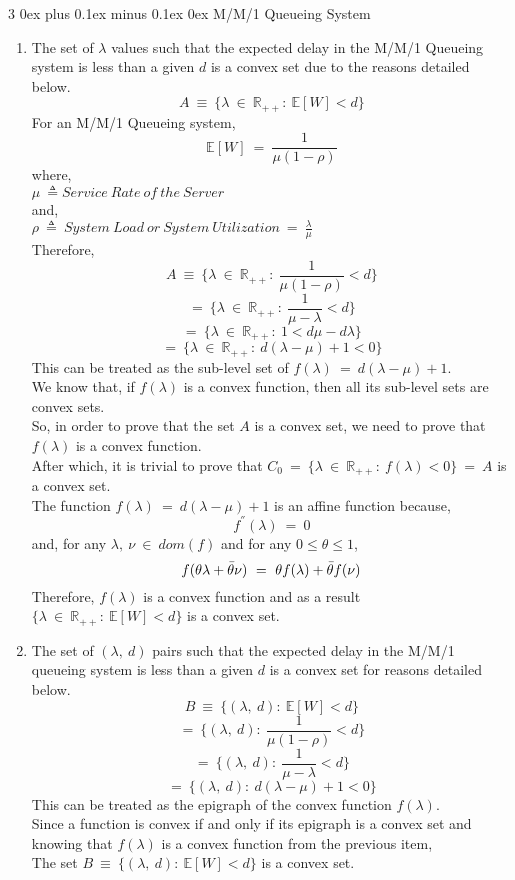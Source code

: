 \documentclass[12pt, draftcls, onecolumn]{IEEEtran}
\makeatletter
\def\subsubsection{\@startsection{subsubsection}%
                                 {3}%
                                 {\z@}%
                                 {0ex plus 0.1ex minus 0.1ex}%
                                 {0ex}%
                                 {\normalfont\normalsize\bfseries}}%
\makeatother
\begin{document}
\subsubsection{M/M/1 Queueing System}
\begin{enumerate}
    \item The set of $\lambda$ values such that the expected delay in the M/M/1 Queueing system is less than a given $d$ is a convex set due to the reasons detailed below.
    \[A\ \equiv\ \{\lambda\ \in\ \mathbb{R}_{++}:\ \mathbb{E}[W] < d\}\]
    For an M/M/1 Queueing system,
    \[\mathbb{E}[W]\ =\ \frac{1}{\mu(1-\rho)}\]
    where, 
    \\$\mu\ \triangleq Service\ Rate\ of\ the\ Server$
    \\and, 
    \\$\rho\ \triangleq\ System\ Load\ or\ System\ Utilization\ =\ \frac{\lambda}{\mu}$
    \\Therefore,
    \[A\ \equiv\ \{\lambda\ \in\ \mathbb{R}_{++}:\ \frac{1}{\mu(1-\rho)} < d\}\]
    \[=\ \{\lambda\ \in\ \mathbb{R}_{++}:\ \frac{1}{\mu-\lambda} < d\}\]
    \[=\ \{\lambda\ \in\ \mathbb{R}_{++}:\ 1 < d\mu-d\lambda\}\]
    \[=\ \{\lambda\ \in\ \mathbb{R}_{++}:\ d(\lambda-\mu)+1 < 0\}\]
    This can be treated as the sub-level set of $f(\lambda)\ =\ d(\lambda-\mu)+1$.
    \\We know that, if $f(\lambda)$ is a convex function, then all its sub-level sets are convex sets.
    \\So, in order to prove that the set $A$ is a convex set, we need to prove that $f(\lambda)$ is a convex function. \\After which, it is trivial to prove that $C_0\ =\ \{\lambda\ \in\ \mathbb{R}_{++}:\ f(\lambda) < 0\}\ =\ A$ is a convex set.
    \\The function $f(\lambda)\ =\ d(\lambda-\mu)+1$ is an affine function because,
    \[f^{''}(\lambda)\ =\ 0\]
    and, for any $\lambda,\ \nu\ \in\ dom(f)$ and for any $0 \leq \theta \leq 1$,
    \[f(\theta \lambda + \Bar{\theta} \nu)\ =\ \theta f(\lambda) + \Bar{\theta} f(\nu)\]
    Therefore, $f(\lambda)$ is a convex function and as a result $\{\lambda\ \in\ \mathbb{R}_{++}:\ \mathbb{E}[W] < d\}$ is a convex set.
    \item The set of $(\lambda,\ d)$ pairs such that the expected delay in the M/M/1 queueing system is less than a given $d$ is a convex set for reasons detailed below.
    \[B\ \equiv\ \{(\lambda,\ d):\ \mathbb{E}[W] < d\}\]
    \[=\ \{(\lambda,\ d):\ \frac{1}{\mu(1-\rho)} < d\}\]
    \[=\ \{(\lambda,\ d):\ \frac{1}{\mu-\lambda} < d\}\]
    \[=\ \{(\lambda,\ d):\ d(\lambda-\mu)+1 < 0\}\]
    This can be treated as the epigraph of the convex function $f(\lambda)$.
    \\Since a function is convex if and only if its epigraph is a convex set and knowing that $f(\lambda)$ is a convex function from the previous item, 
    \\The set $B\ \equiv\ \{(\lambda,\ d):\ \mathbb{E}[W] < d\}$ is a convex set.
\end{enumerate}
\end{document}
